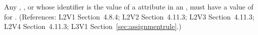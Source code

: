 Any \Compartment, \Species, \Parameter or \SpeciesReference whose identifier is the value of a
 attribute in an \AssignmentRule, must have a value of
 for .  (References: L2V1 Section~4.8.4; L2V2
Section~4.11.3; L2V3 Section~4.11.3; L2V4 Section~4.11.3; L3V1 Section~\ref{sec:assignmentrule}.)
